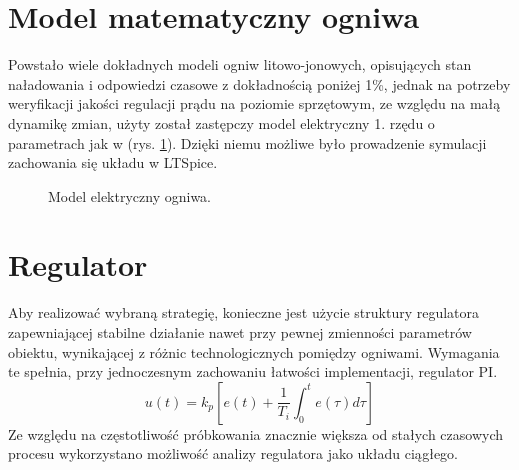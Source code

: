 \documentclass[polish,engineer]{polsl-msth}
\begin{document}
\section{Model matematyczny ogniwa}
Powstało wiele dokładnych modeli\cite{1634598_BATT_MODELS} ogniw litowo-jonowych, opisujących stan naładowania i odpowiedzi czasowe z dokładnością poniżej 1\%, jednak na potrzeby weryfikacji jakości regulacji prądu na poziomie sprzętowym, ze względu na małą dynamikę zmian, użyty został zastępczy model elektryczny 1. rzędu o parametrach jak w \cite{8759769_cellmodel1storder} (rys. \ref{img:thevenin_model}). Dzięki niemu możliwe było prowadzenie symulacji zachowania się układu w LTSpice.
\begin{figure}[hbtp]
    \centering
     \caption{Model elektryczny ogniwa.\label{img:thevenin_model}}
\end{figure}


\section{Regulator}
Aby realizować wybraną strategię, konieczne jest użycie struktury regulatora zapewniającej stabilne działanie nawet przy pewnej zmienności parametrów obiektu, wynikającej z różnic technologicznych pomiędzy ogniwami. Wymagania te spełnia, przy jednoczesnym zachowaniu łatwości implementacji, regulator PI.
\begin{equation}
     u(t)=k_{p}\left[e(t)+{\frac {1}{T_{i}}}\int _{0}^{t}e(\tau )d\tau \right]
     \label{eq:PI_timebased}
\end{equation}
Ze względu na częstotliwość próbkowania znacznie większa od stałych czasowych procesu wykorzystano możliwość analizy regulatora jako układu ciągłego.
\end{document}
